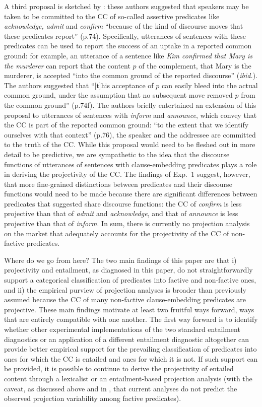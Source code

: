 \documentclass[11pt,fleqn]{article}
\newcommand{\6}{\mbox{$[\hspace*{-.6mm}[$}}
\newcommand{\9}{\mbox{$]\hspace*{-.6mm}]$}}
\begin{document}
{\begin{itemize}
A third proposal is sketched by \citet{anand-hacquard2014}: these authors suggested that speakers may be taken to be committed to the CC of so-called assertive predicates like {\em acknowledge, admit} and {\em confirm} ``because of the kind of discourse moves that these predicates report'' (p.74). Specifically, utterances of sentences with these predicates can be used to report the success of an uptake in a reported common ground: for example, an utterance of a sentence like {\em Kim confirmed that Mary is the murderer} can report that the content $p$ of the  complement, that Mary is the murderer, is accepted ``into the common ground of the reported discourse'' ({\em ibid.}). The authors suggested that ``[t]his acceptance of $p$ can easily bleed into the actual common ground, under the assumption that no subsequent move removed $p$ from the common ground'' (p.74f). The authors briefly entertained an extension of this proposal to utterances of sentences with {\em inform} and {\em announce}, which convey that the CC is part of the reported common ground: ``to the extent that we identify ourselves with that context'' (p.76), the speaker and the addressee are committed to the truth of the CC. While this proposal would need to be fleshed out in more detail to be predictive, we are sympathetic to the idea that the discourse functions of utterances of sentences with clause-embedding predicates plays a role in deriving the projectivity of the CC. The findings of Exp.~1 suggest, however, that more fine-grained distinctions between predicates and their discourse functions would need to be made because there are significant differences between predicates that \citet{anand-hacquard2014} suggested share discourse functions: the CC of {\em confirm} is less projective than that of {\em admit} and {\em acknowledge}, and that of {\em announce} is less projective than that of {\em inform}. In sum, there is currently no projection analysis on the market that adequately accounts for the projectivity of the CC of non-factive predicates. 

Where do we go from here? The two main findings of this paper are that i) projectivity and entailment, as diagnosed in this paper, do not straightforwardly support a categorical classification of predicates into factive and non-factive ones, and ii) the empirical purview of projection analyses is broader than previously assumed because the CC of many non-factive clause-embedding predicates are projective. These main findings motivate at least two fruitful ways forward, ways that are entirely compatible with one another. The first way forward is to identify whether other experimental implementations of the two standard entailment diagnostics or an application of a different entailment diagnostic altogether can provide better empirical support for the prevailing classification of predicates into ones for which the CC is entailed and ones for which it is not. If such support can be provided, it is possible to continue to derive the projectivity of entailed content through a lexicalist or an entailment-based projection analysis (with the caveat, as discussed above and in \citealt{tbd-variability}, that current analyses do not predict the observed projection variability among factive predicates). 


\end{itemize}}
\end{document}
